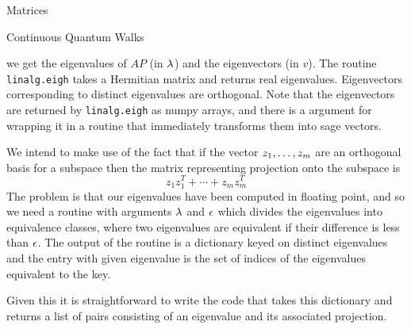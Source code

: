 \begin{chap}{Matrices}
\begin{sect}{Continuous Quantum Walks}
%
\begin{para}
we get the eigenvalues of $AP$ (in $\lambda$) and the eigenvectors (in \(v\)).
The routine \verb|linalg.eigh| takes a Hermitian matrix and returns real eigenvalues.
Eigenvectors corresponding to distinct eigenvalues are orthogonal. Note that the
eigenvectors are returned by
\verb|linalg.eigh| as numpy arrays, and there is a argument for
wrapping it in a routine that immediately transforms them into sage vectors.
\end{para}
%
\begin{para}
We intend to make use of the fact that if the vector $z_{1},\ldots,z_{m}$ are an orthogonal basis
for a subspace then the matrix representing projection onto the subspace is
\[
    z_1z_1^T+\cdots+z_mz_m^T
\]
The problem is that our eigenvalues have been computed in floating point, and
so we need a routine with arguments $\lambda$ and $\epsilon$ which divides the
eigenvalues into equivalence classes, where two eigenvalues are equivalent if their
difference is less than $\epsilon$. The output of the routine
is a dictionary keyed on distinct eigenvalues and the entry with given eigenvalue
is the set of indices of the eigenvalues equivalent to the key.
\end{para}
%
\begin{para}
Given this it is straightforward to write the code that takes this dictionary and
returns a list of pairs consisting of an eigenvalue and its associated projection.
\end{para}
%
\end{sect}
%
\end{chap}